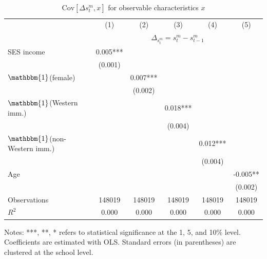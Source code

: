 \begin{table}[t!]
\begin{center}
\caption{$\mathrm{Cov}[\Delta{s^m_{t}},x]$ for observable characteristics $x$}
\label{tbl:OLS_ass2and3}
\begin{tabular}{l*{5}{c}}
\toprule\toprule
&\multicolumn{1}{c}{(1)}&\multicolumn{1}{c}{(2)}&\multicolumn{1}{c}{(3)}&\multicolumn{1}{c}{(4)}&\multicolumn{1}{c}{(5)}\\
&\multicolumn{5}{c}{$\Delta_{s^m_{t}}=s^m_t-s^m_{t-1}$}\\
\midrule
SES income          &       0.005***&               &               &               &               \\
                    &     (0.001)   &               &               &               &               \\
$\mathbbm{1}$(female)&               &       0.007***&               &               &               \\
                    &               &     (0.002)   &               &               &               \\
$\mathbbm{1}$(Western imm.)&               &               &       0.018***&               &               \\
                    &               &               &     (0.004)   &               &               \\
$\mathbbm{1}$(non-Western imm.)&               &               &               &       0.012***&               \\
                    &               &               &               &     (0.004)   &               \\
Age                 &               &               &               &               &      -0.005** \\
                    &               &               &               &               &     (0.002)   \\
[.25em]
Observations        &      148019   &      148019   &      148019   &      148019   &      148019   \\
\(R^{2}\)           &       0.000   &       0.000   &       0.000   &       0.000   &       0.000   \\
       \bottomrule \bottomrule
    \end{tabular}
        \begin{tablenotes}
	\footnotesize
        \item[] Notes:  ***, **, * refers to statistical significance at the 1, 5, and 10\% level. Coefficients are estimated with OLS. Standard errors (in parentheses) are clustered at the school level.
        \end{tablenotes}
 \end{center}
\end{table}
